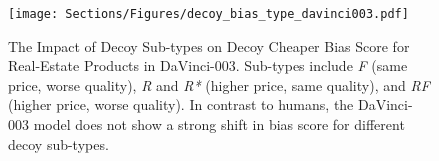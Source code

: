 \begin{figure}[th!] 
\centering
\texttt{[image: Sections/Figures/decoy\_bias\_type\_davinci003.pdf]}
\caption{The Impact of Decoy Sub-types on Decoy Cheaper Bias Score for Real-Estate Products in DaVinci-003. Sub-types include \textit{F} (same price, worse quality), \textit{R} and \textit{R*} (higher price, same quality), and \textit{RF} (higher price, worse quality). In contrast to humans, the DaVinci-003 model does not show a strong shift in bias score for different decoy sub-types.}
\label{fig:decoy_type_davinci003}
\end{figure}

